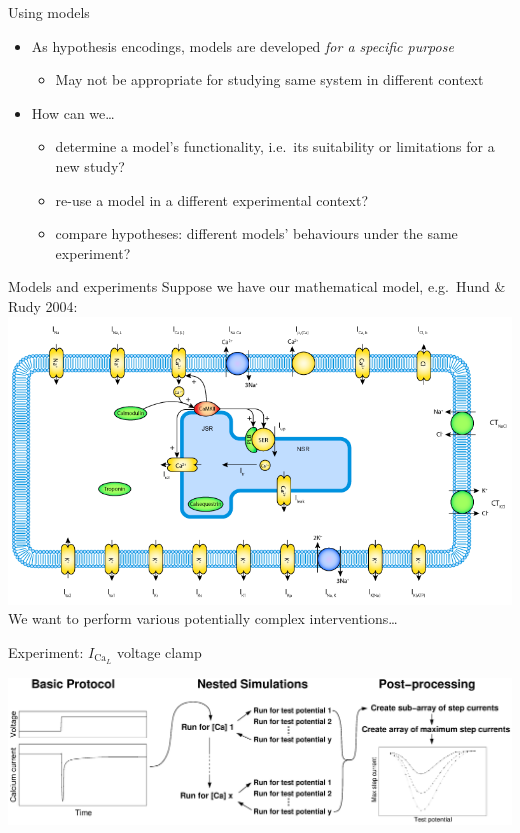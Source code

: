 \documentclass[t,xcolor={usenames,dvipsnames}]{beamer}
\newcommand{\subitem}[1]{\begin{itemize}[<.->]\item #1 \end{itemize}}
\begin{document}
\begin{frame}{Using models}
\begin{itemize}[<+->]
\item As hypothesis encodings, models are developed \emph{for a specific purpose}
  \subitem{May not be appropriate for studying same system in different context}
\item How can we\ldots
  \begin{itemize}
  \item determine a model's functionality, i.e.\ its suitability or limitations for a new study?
  \item re-use a model in a different experimental context?
  \item compare hypotheses: different models' behaviours under the same experiment?
  \end{itemize}
\end{itemize}
\end{frame}


\begin{frame}{Models and experiments}
\small
Suppose we have our mathematical model, e.g.\ Hund \& Rudy 2004:\\
\includegraphics[width=\textwidth]{hund_2004}\\
We want to perform various potentially complex interventions\ldots
\end{frame}


\begin{frame}{Experiment: $I_{\textrm{Ca}_L}$ voltage clamp}
\begin{center}
\includegraphics[width=\textwidth]{ICaLIntro}
\end{center}
\end{frame}
\end{document}
